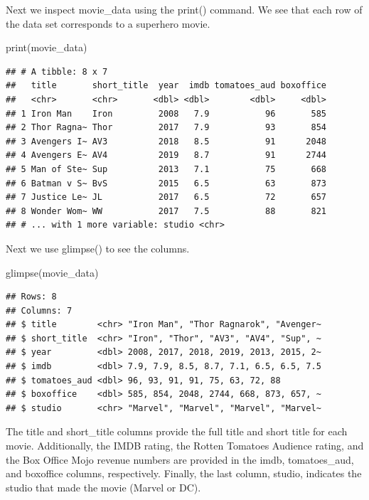 \documentclass[
]{krantz}
\makeatletter
\newenvironment{Shaded}{\begin{snugshade}}{\end{snugshade}}
\newcommand{\FunctionTok}[1]{\textcolor[rgb]{0,0,0}{#1}}
\newcommand{\NormalTok}[1]{#1}
\newenvironment{kframe}{%
\medskip{}
\setlength{\fboxsep}{.8em}
 \def\at@end@of@kframe{}%
 \ifinner\ifhmode%
  \def\at@end@of@kframe{\end{minipage}}%
  \begin{minipage}{\columnwidth}%
 \fi\fi%
 \def\FrameCommand##1{\hskip\@totalleftmargin \hskip-\fboxsep
 \colorbox{shadecolor}{##1}\hskip-\fboxsep
     \hskip-\linewidth \hskip-\@totalleftmargin \hskip\columnwidth}%
 \MakeFramed {\advance\hsize-\width
   \@totalleftmargin\z@ \linewidth\hsize
   \@setminipage}}%
 {\par\unskip\endMakeFramed%
 \at@end@of@kframe}
\renewenvironment{Shaded}{\begin{kframe}}{\end{kframe}}
\makeatother
\begin{document}
Next we inspect movie\_data using the print() command. We see that each row of the data set corresponds to a superhero movie.

\begin{Shaded}
\begin{Highlighting}[]
\FunctionTok{print}\NormalTok{(movie\_data)}
\end{Highlighting}
\end{Shaded}

\begin{verbatim}
## # A tibble: 8 x 7
##   title       short_title  year  imdb tomatoes_aud boxoffice
##   <chr>       <chr>       <dbl> <dbl>        <dbl>     <dbl>
## 1 Iron Man    Iron         2008   7.9           96       585
## 2 Thor Ragna~ Thor         2017   7.9           93       854
## 3 Avengers I~ AV3          2018   8.5           91      2048
## 4 Avengers E~ AV4          2019   8.7           91      2744
## 5 Man of Ste~ Sup          2013   7.1           75       668
## 6 Batman v S~ BvS          2015   6.5           63       873
## 7 Justice Le~ JL           2017   6.5           72       657
## 8 Wonder Wom~ WW           2017   7.5           88       821
## # ... with 1 more variable: studio <chr>
\end{verbatim}

Next we use glimpse() to see the columns.

\begin{Shaded}
\begin{Highlighting}[]
\FunctionTok{glimpse}\NormalTok{(movie\_data)}
\end{Highlighting}
\end{Shaded}

\begin{verbatim}
## Rows: 8
## Columns: 7
## $ title        <chr> "Iron Man", "Thor Ragnarok", "Avenger~
## $ short_title  <chr> "Iron", "Thor", "AV3", "AV4", "Sup", ~
## $ year         <dbl> 2008, 2017, 2018, 2019, 2013, 2015, 2~
## $ imdb         <dbl> 7.9, 7.9, 8.5, 8.7, 7.1, 6.5, 6.5, 7.5
## $ tomatoes_aud <dbl> 96, 93, 91, 91, 75, 63, 72, 88
## $ boxoffice    <dbl> 585, 854, 2048, 2744, 668, 873, 657, ~
## $ studio       <chr> "Marvel", "Marvel", "Marvel", "Marvel~
\end{verbatim}

The title and short\_title columns provide the full title and short title for each movie. Additionally, the IMDB rating, the Rotten Tomatoes Audience rating, and the Box Office Mojo revenue numbers are provided in the imdb, tomatoes\_aud, and boxoffice columns, respectively. Finally, the last column, studio, indicates the studio that made the movie (Marvel or DC).
\end{document}
